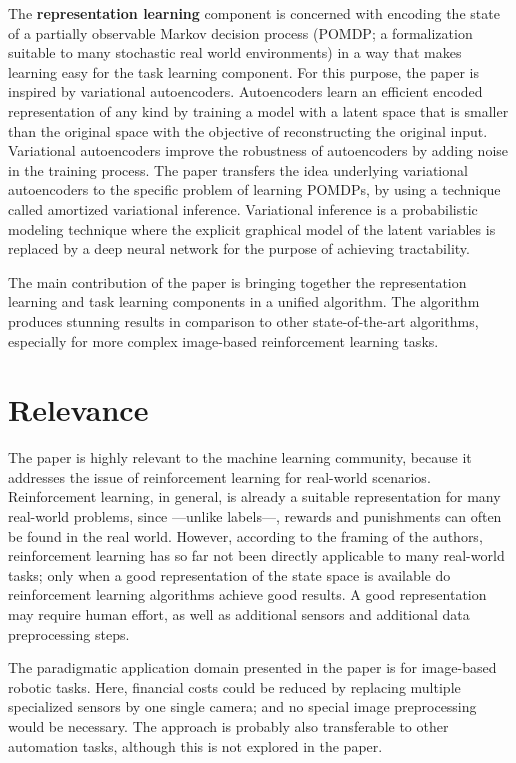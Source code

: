 \documentclass[letterpaper]{article} %
\begin{document}
The \textbf{representation learning} component is concerned with encoding the state of a partially observable Markov decision process (POMDP; a formalization suitable to many stochastic real world environments) in a way that makes learning easy for the task learning component. For this purpose, the paper is inspired by variational autoencoders. Autoencoders learn an efficient encoded representation of any kind by training a model with a latent space that is smaller than the original space with the objective of reconstructing the original input. Variational autoencoders improve the robustness of autoencoders by adding noise in the training process. The paper transfers the idea underlying variational autoencoders to the specific problem of learning POMDPs, by using a technique called amortized variational inference. Variational inference is a probabilistic modeling technique where the explicit graphical model of the latent variables is replaced by a deep neural network for the purpose of achieving tractability.\cite{zhang2018advances}

The main contribution of the paper is bringing together the representation learning and task learning components in a unified algorithm. The algorithm produces stunning results in comparison to other state-of-the-art algorithms, especially for more complex image-based reinforcement learning tasks.

\section{Relevance}

The paper is highly relevant to the machine learning community, because it addresses the issue of reinforcement learning for real-world scenarios. Reinforcement learning, in general, is already a suitable representation for many real-world problems, since —unlike labels—, rewards and punishments can often be found in the real world. However,  according to the framing of the authors, reinforcement learning has so far not been directly applicable to many real-world tasks; only when a good representation of the state space is available do reinforcement learning algorithms achieve good results. A good representation may require human effort, as well as additional sensors and additional data preprocessing steps. 

The paradigmatic application domain presented in the paper is for image-based robotic tasks. Here, financial costs could be reduced by replacing multiple specialized sensors by one single camera; and no special image preprocessing would be necessary. The approach is probably also transferable to other automation tasks, although this is not explored in the paper.
\end{document}
